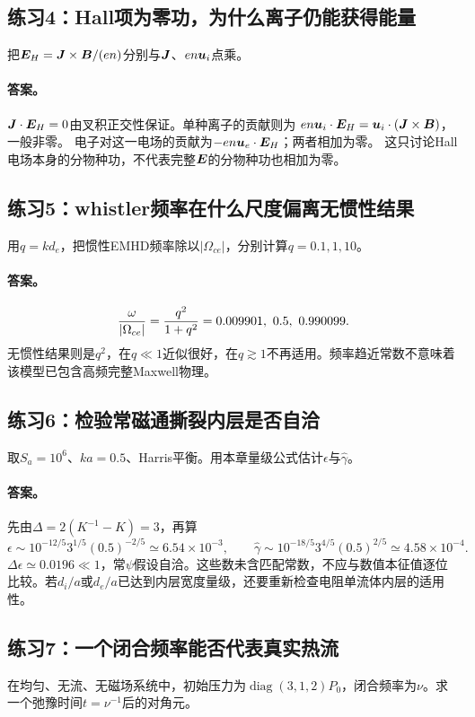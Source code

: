 \subsection{练习4：Hall项为零功，为什么离子仍能获得能量}
把$\bm{E}_H=\bm{J}\times\bm{B}/(en)$分别与$\bm{J}$、$en\bm{u}_i$点乘。
\paragraph{答案。}
$\bm{J}\cdot\bm{E}_H=0$由叉积正交性保证。单种离子的贡献则为
$en\bm{u}_i\cdot\bm{E}_H=\bm{u}_i\cdot(\bm{J}\times\bm{B})$，一般非零。
电子对这一电场的贡献为$-en\bm{u}_e\cdot\bm{E}_H$；两者相加为零。
这只讨论Hall电场本身的分物种功，不代表完整$\bm{E}$的分物种功也相加为零。

\subsection{练习5：whistler频率在什么尺度偏离无惯性结果}
用$q=kd_e$，把惯性EMHD频率除以$|\Omega_{ce}|$，分别计算$q=0.1,1,10$。
\paragraph{答案。}
\begin{equation}
 {\omega\over|\Omega_{ce}|}={q^2\over1+q^2}
 =0.009901,\ 0.5,\ 0.990099.
\end{equation}
无惯性结果则是$q^2$，在$q\ll1$近似很好，在$q\gtrsim1$不再适用。频率趋近常数不意味着该模型已包含高频完整Maxwell物理。

\subsection{练习6：检验常磁通撕裂内层是否自洽}
取$S_a=10^6$、$ka=0.5$、Harris平衡。用本章量级公式估计$\epsilon$与$\hat\gamma$。
\paragraph{答案。}
先由$\Delta=2(K^{-1}-K)=3$，再算
\begin{equation}
 \epsilon\sim10^{-12/5}3^{1/5}(0.5)^{-2/5}
 \simeq6.54\times10^{-3},\qquad
 \hat\gamma\sim10^{-18/5}3^{4/5}(0.5)^{2/5}
 \simeq4.58\times10^{-4}.
\end{equation}
$\Delta\epsilon\simeq0.0196\ll1$，常$\psi$假设自洽。这些数未含匹配常数，不应与数值本征值逐位比较。若$d_i/a$或$d_e/a$已达到内层宽度量级，还要重新检查电阻单流体内层的适用性。

\subsection{练习7：一个闭合频率能否代表真实热流}
在均匀、无流、无磁场系统中，初始压力为$\operatorname{diag}(3,1,2)P_0$，闭合频率为$\nu$。求一个弛豫时间$t=\nu^{-1}$后的对角元。
